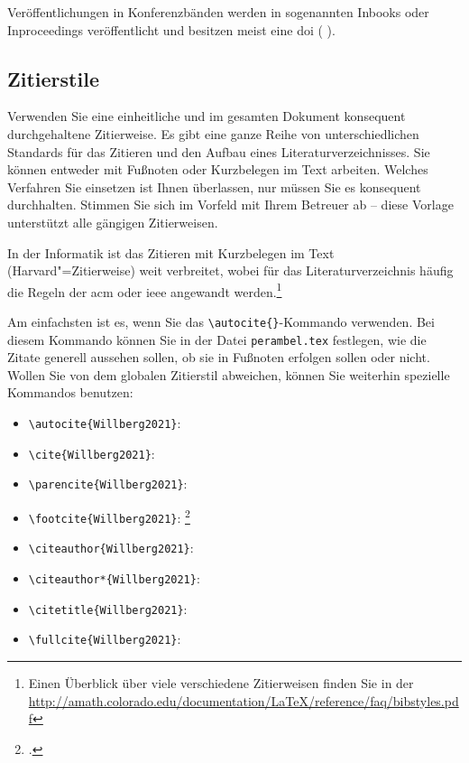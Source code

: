 Veröffentlichungen in Konferenzbänden werden in sogenannten Inbooks oder Inproceedings veröffentlicht und besitzen meist eine \gls{doi} (\zb{} \cite{Lang2022}).

\subsection{Zitierstile}

Verwenden Sie eine einheitliche und im gesamten Dokument konsequent durchgehaltene Zitierweise. Es gibt eine ganze Reihe von unterschiedlichen Standards für das Zitieren und den Aufbau eines Literaturverzeichnisses. Sie können entweder mit Fußnoten oder Kurzbelegen im Text arbeiten. Welches Verfahren Sie einsetzen ist Ihnen überlassen, nur müssen Sie es konsequent durchhalten. Stimmen Sie sich im Vorfeld mit Ihrem Betreuer ab -- diese Vorlage unterstützt alle gängigen Zitierweisen.

In der Informatik ist das Zitieren mit Kurzbelegen im Text (Harvard"=Zitierweise) weit verbreitet, wobei für das Literaturverzeichnis häufig die Regeln der \gls{acm} oder \gls{ieee} angewandt werden.\footnote{Einen Überblick über viele verschiedene Zitierweisen finden Sie in der \url{http://amath.colorado.edu/documentation/LaTeX/reference/faq/bibstyles.pdf}}

Am einfachsten ist es, wenn Sie das \verb+\autocite{}+-Kommando verwenden. Bei diesem Kommando können Sie in der Datei \texttt{perambel.tex} festlegen, wie die Zitate generell aussehen sollen, \zb{} ob sie in Fußnoten erfolgen sollen oder nicht. Wollen Sie von dem globalen Zitierstil abweichen, können Sie weiterhin spezielle Kommandos benutzen:

\begin{itemize}
	\item \verb+\autocite{Willberg2021}+: \autocite{Willberg2021}
	\item \verb+\cite{Willberg2021}+: \cite{Willberg2021}
	\item \verb+\parencite{Willberg2021}+: \parencite{Willberg2021}
	\item \verb+\footcite{Willberg2021}+: \footcite{Willberg2021}
	\item \verb+\citeauthor{Willberg2021}+: \citeauthor{Willberg2021}
	\item \verb+\citeauthor*{Willberg2021}+: \citeauthor*{Willberg2021}
	\item \verb++: \citetitle{Willberg2021}
	\item \verb++: \fullcite{Willberg2021}
\end{itemize}

